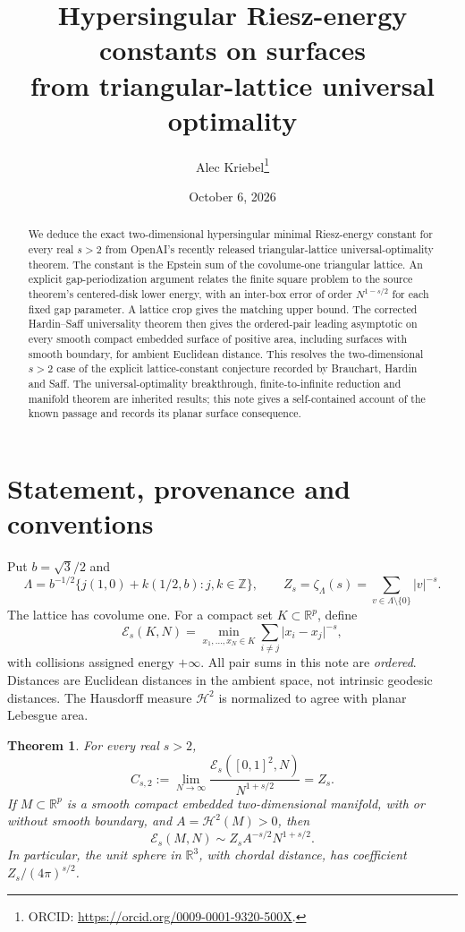 \documentclass[11pt]{article}
\title{Hypersingular Riesz-energy constants on surfaces\protect\\from triangular-lattice universal optimality}
\author{Alec Kriebel\thanks{ORCID: \url{https://orcid.org/0009-0001-9320-500X}.}}
\date{October 6, 2026}
\newtheorem{theorem}{Theorem}
\newcommand{\R}{\mathbb R}\newcommand{\Z}{\mathbb Z}
\newcommand{\Es}{\mathcal E_s}\newcommand{\Hs}{\mathcal H_s}
\newcommand{\abs}[1]{\lvert#1\rvert}\newcommand{\norm}[1]{\lVert#1\rVert}
\begin{document}
\maketitle
\begin{abstract}
We deduce the exact two-dimensional hypersingular minimal Riesz-energy
constant for every real $s>2$ from OpenAI's recently released triangular-lattice
universal-optimality theorem. The constant is the Epstein sum of the
covolume-one triangular lattice. An explicit gap-periodization argument
relates the finite square problem to the source theorem's centered-disk
lower energy, with an inter-box error of order $N^{1-s/2}$ for each fixed gap
parameter. A lattice crop gives the matching upper bound. The corrected
Hardin--Saff universality theorem then gives the ordered-pair leading
asymptotic on every smooth compact embedded surface of positive area,
including surfaces with smooth boundary, for ambient Euclidean distance.
This resolves the two-dimensional $s>2$ case of the explicit lattice-constant
conjecture recorded by Brauchart, Hardin and Saff. The universal-optimality
breakthrough, finite-to-infinite reduction and manifold theorem are inherited
results; this note gives a self-contained account of the known passage and
records its planar surface consequence.
\end{abstract}

\section{Statement, provenance and conventions}
Put $b=\sqrt3/2$ and
\[
 \Lambda=b^{-1/2}\{j(1,0)+k(1/2,b):j,k\in\Z\},\qquad
 Z_s=\zeta_\Lambda(s)=\sum_{v\in\Lambda\setminus\{0\}}\abs{v}^{-s}.
\]
The lattice has covolume one. For a compact set $K\subset\R^p$, define
\[
 \Es(K,N)=\min_{x_1,\ldots,x_N\in K}
        \sum_{i\ne j}\abs{x_i-x_j}^{-s},
\]
with collisions assigned energy $+\infty$. All pair sums in this note are
\emph{ordered}. Distances are Euclidean distances in the ambient space,
not intrinsic geodesic distances. The Hausdorff measure $\mathcal H^2$ is
normalized to agree with planar Lebesgue area.

\begin{theorem}\label{thm:main}
For every real $s>2$,
\begin{equation}\label{eq:square}
 C_{s,2}:=\lim_{N\to\infty}\frac{\Es([0,1]^2,N)}{N^{1+s/2}}=Z_s.
\end{equation}
If $M\subset\R^p$ is a smooth compact embedded two-dimensional manifold,
with or without smooth boundary, and $A=\mathcal H^2(M)>0$, then
\begin{equation}\label{eq:surface}
 \Es(M,N)\sim Z_s A^{-s/2}N^{1+s/2}.
\end{equation}
In particular, the unit sphere in $\R^3$, with chordal distance, has
coefficient $Z_s/(4\pi)^{s/2}$.
\end{theorem}
\end{document}
